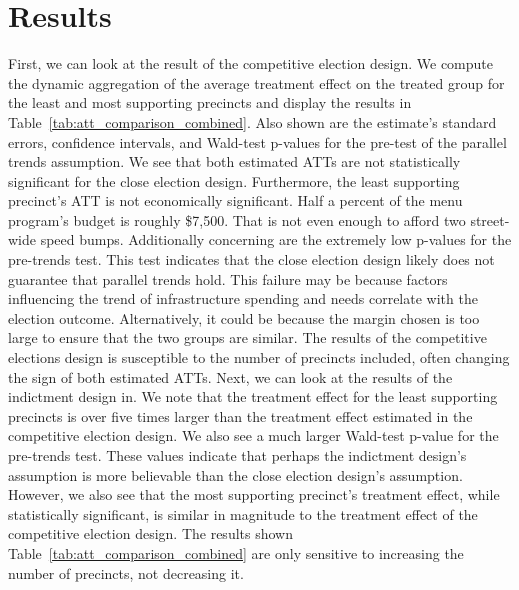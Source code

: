 \section{Results}\label{sec:results}

First, we can look at the result of the competitive election design.
We compute the dynamic aggregation of the average treatment effect on the treated group for the least and most supporting precincts and display the results in Table~\ref{tab:att_comparison_combined}.
Also shown are the estimate's standard errors, confidence intervals, and Wald-test p-values for the pre-test of the parallel trends assumption.
We see that both estimated ATTs are not statistically significant for the close election design.
Furthermore, the least supporting precinct's ATT is not economically significant. 
Half a percent of the menu program's budget is roughly \$7,500. 
That is not even enough to afford two street-wide speed bumps.
Additionally concerning are the extremely low p-values for the pre-trends test.
This test indicates that the close election design likely does not guarantee that parallel trends hold.
This failure may be because factors influencing the trend of infrastructure spending and needs correlate with the election outcome.
Alternatively, it could be because the margin chosen is too large to ensure that the two groups are similar.
The results of the competitive elections design is susceptible to the number of precincts included, often changing the sign of both estimated ATTs.
Next, we can look at the results of the indictment design in.
We note that the treatment effect for the least supporting precincts is over five times larger than the treatment effect estimated in the competitive election design.
We also see a much larger Wald-test p-value for the pre-trends test.
These values indicate that perhaps the indictment design's assumption is more believable than the close election design's assumption.
However, we also see that the most supporting precinct's treatment effect, while statistically significant, is similar in magnitude to the treatment effect of the competitive election design.
The results shown Table~\ref{tab:att_comparison_combined} are only sensitive to increasing the number of precincts, not decreasing it.


